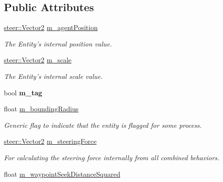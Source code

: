 \subsection*{Public Attributes}
\begin{DoxyCompactItemize}
\item 
\hypertarget{classsteer_1_1_agent_a460f141af67ed089ab2c75ea8f710483}{\hyperlink{structsteer_1_1_vector2}{steer\-::\-Vector2} \hyperlink{classsteer_1_1_agent_a460f141af67ed089ab2c75ea8f710483}{m\-\_\-agent\-Position}}\label{classsteer_1_1_agent_a460f141af67ed089ab2c75ea8f710483}

\begin{DoxyCompactList}\small\item\em The Entity's internal position value. \end{DoxyCompactList}\item 
\hypertarget{classsteer_1_1_agent_aee653601201ee2f703c5f0ae9f1e86f0}{\hyperlink{structsteer_1_1_vector2}{steer\-::\-Vector2} \hyperlink{classsteer_1_1_agent_aee653601201ee2f703c5f0ae9f1e86f0}{m\-\_\-scale}}\label{classsteer_1_1_agent_aee653601201ee2f703c5f0ae9f1e86f0}

\begin{DoxyCompactList}\small\item\em The Entity's internal scale value. \end{DoxyCompactList}\item 
\hypertarget{classsteer_1_1_agent_ad6d2ab363bf749ef3ae3289f9044991d}{bool {\bfseries m\-\_\-tag}}\label{classsteer_1_1_agent_ad6d2ab363bf749ef3ae3289f9044991d}

\item 
float \hyperlink{classsteer_1_1_agent_aec01d1d8d1d1e75714ccc41e2a9d2c8f}{m\-\_\-bounding\-Radius}
\begin{DoxyCompactList}\small\item\em Generic flag to indicate that the entity is flagged for some process. \end{DoxyCompactList}\item 
\hypertarget{classsteer_1_1_agent_ab24747403d324e6d3900f4cd07245cef}{\hyperlink{structsteer_1_1_vector2}{steer\-::\-Vector2} \hyperlink{classsteer_1_1_agent_ab24747403d324e6d3900f4cd07245cef}{m\-\_\-steering\-Force}}\label{classsteer_1_1_agent_ab24747403d324e6d3900f4cd07245cef}

\begin{DoxyCompactList}\small\item\em For calculating the steering force internally from all combined behaviors. \end{DoxyCompactList}\item 
\hypertarget{classsteer_1_1_agent_a10a7638abe7f1a5b02663aa2e4d9eab7}{float \hyperlink{classsteer_1_1_agent_a10a7638abe7f1a5b02663aa2e4d9eab7}{m\-\_\-waypoint\-Seek\-Distance\-Squared}}\label{classsteer_1_1_agent_a10a7638abe7f1a5b02663aa2e4d9eab7}


\end{DoxyCompactItemize}
